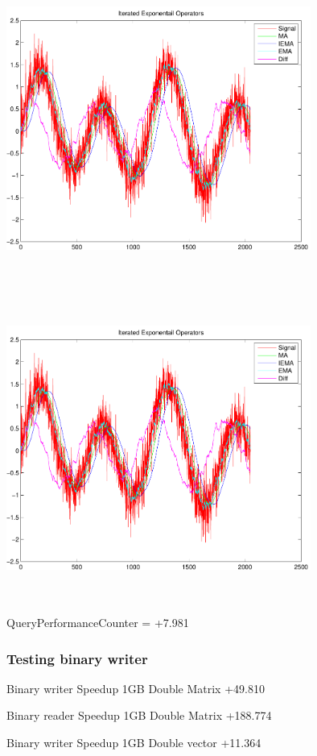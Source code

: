\documentclass[9pt]{article}
\theoremstyle{plain}
\theoremstyle{definition}
\theoremstyle{remark}
\numberwithin{equation}{section}
\begin{document}
\includegraphics[width=10.0cm,height=10.0cm]{IteratedExponentailOperators.pdf}

\includegraphics[width=10.0cm,height=10.0cm]{IteratedExponentailOperators.pdf}

QueryPerformanceCounter  =  +7.981
\subsubsection{Testing binary writer}
Binary writer Speedup 1GB Double Matrix +49.810

Binary reader Speedup 1GB Double Matrix +188.774

Binary writer Speedup 1GB Double vector +11.364
\end{document}

